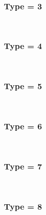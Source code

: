 \documentclass{article}
\begin{document}
            \\
        
        
        
            \subsubsection*{Type = 3}    
            
            \\
        
        
        
            \subsubsection*{Type = 4}    
            
            \\
        
        
        
            \subsubsection*{Type = 5}    
            
            \\
        
        
        
            \subsubsection*{Type = 6}    
            
            \\
        
        
        
            \subsubsection*{Type = 7}    
            
            \\
        
        
        
            \subsubsection*{Type = 8}    
            
            \\
        
\end{document}
